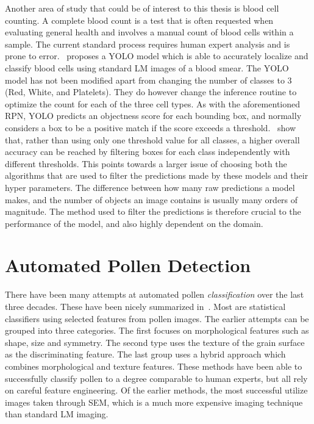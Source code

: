 Another area of study that could be of interest to this thesis is blood cell counting.
A complete blood count is a test that is often requested when evaluating general health and involves a manual count of blood cells within a sample.
The current standard process requires human expert analysis and is prone to error.~\cite{islam_machine_2019} proposes a YOLO model which is able to accurately localize and classify blood cells using standard LM images of a blood smear.
The YOLO model has not been modified apart from changing the number of classes to 3 (Red, White, and Platelets).
They do however change the inference routine to optimize the count for each of the three cell types.
As with the aforementioned RPN, YOLO predicts an objectness score for each bounding box, and normally considers a box to be a positive match if the score exceeds a threshold.~\citeauthor{islam_machine_2019} show that, rather than using only one threshold value for all classes, a higher overall accuracy can be reached by filtering boxes for each class independently with different thresholds.
This points towards a larger issue of choosing both the algorithms that are used to filter the predictions made by these models and their hyper parameters.
The difference between how many raw predictions a model makes, and the number of objects an image contains is usually many orders of magnitude.
The method used to filter the predictions is therefore crucial to the performance of the model, and also highly dependent on the domain.

\section{Automated Pollen Detection}\label{sec:rel-pollen}
There have been many attempts at automated pollen \textit{classification} over the last three decades.
These have been nicely summarized in~\cite{sevillano_improving_2018}.
Most are statistical classifiers using selected features from pollen images.
The earlier attempts can be grouped into three categories.
The first focuses on morphological features such as shape, size and symmetry.
The second type uses the texture of the grain surface as the discriminating feature.
The last group uses a hybrid approach which combines morphological and texture features.
These methods have been able to successfully classify pollen to a degree comparable to human experts, but all rely on careful feature engineering.
Of the earlier methods, the most successful utilize images taken through SEM, which is a much more expensive imaging technique than standard LM imaging.

